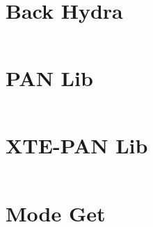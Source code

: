 \begin{verbatim}
\end{verbatim}

\section{Back Hydra}

\begin{verbatim}
\end{verbatim}

\section{PAN Lib}

\begin{verbatim}
\end{verbatim}

\section{XTE-PAN Lib}

\begin{verbatim}
\end{verbatim}

\section{Mode Get}

\begin{verbatim}
\end{verbatim}